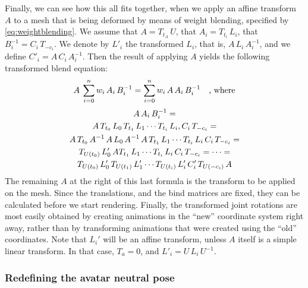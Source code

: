 \noindent
Finally, we can see how this all fits together, when we apply an affine transform $A$ to
a mesh that is being deformed by means of weight blending, specified by \autoref{eq:weightblending}.
We assume that $A = T_{t_A}\,U$, that $A_i = T_{t_i}\,L_i$, that $B_i^{-1} = C_i\,T_{-c_i}$.
We denote by $L'_i$ the transformed $L_i$, that is, $A\,L_i\,A_i^{-1}$, and we define $C'_i = A\,C_i\,A_i^{-1}$.
Then the result of applying $A$ yields the following transformed blend equation:
%
\begin{equation}
 A \:\sum_{i=0}^{n} w_i\, A_i\,B_i^{-1} = \sum_{i=0}^{n} w_i\, A\,A_i\,B_i^{-1} \quad\text{, where}\notag
 \end{equation}
 \begin{gather}
 A\,A_i\,B_i^{-1} = \notag\\
 A\, T_{t_0}\,L_0\,T_{t_1}\,L_1\cdots T_{t_i}\,L_i,C_i\,T_{-c_i}=\notag\\
 A\,T_{t_0}\,A^{-1}\,A\,L_0\,A^{-1}\,A\,T_{t_1}\,L_1\cdots T_{t_i}\,L_i\,C_i\,T_{-c_i} =\notag\\
 T_{U(t_0)}\,L'_0\, A T_{t_1}\,L_1\cdots T_{t_i}\,L_i\,C_i\,T_{-c_i} =\cdots=\notag\\
 T_{U(t_0)}\,L'_0\,T_{U(t_1)}\,L'_1\cdots T_{U(t_i)}\,L'_i\,C'_i\,T_{U(-c_i)}\,A\notag
 \end{gather}
 The remaining $A$ at the right of this last formula is the transform to be applied on the mesh.
 Since the translations, and the bind matrices are fixed, they can be calculated before we start rendering.
 Finally, the transformed joint rotations are most easily obtained by creating animations
 in the ``new'' coordinate system right away, rather than by  transforming
 animations that were created using the ``old'' coordinates.
 Note that $L_i'$ will be an affine transform, unless $A$ itself is a simple linear transform.
 In that case, $T_a=0$, and $L'_i = U\,L_i\,U^{-1}$.

\subsubsection{Redefining the avatar neutral pose}

